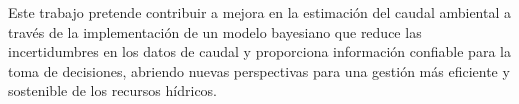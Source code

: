 \documentclass{article}
\begin{document}
{Este trabajo pretende contribuir a mejora en la estimación del caudal ambiental a través de la implementación de un modelo bayesiano que reduce las incertidumbres en los datos de caudal y proporciona información confiable para la toma de decisiones, abriendo nuevas perspectivas para una gestión más eficiente y sostenible de los recursos hídricos.
}
\end{document}

